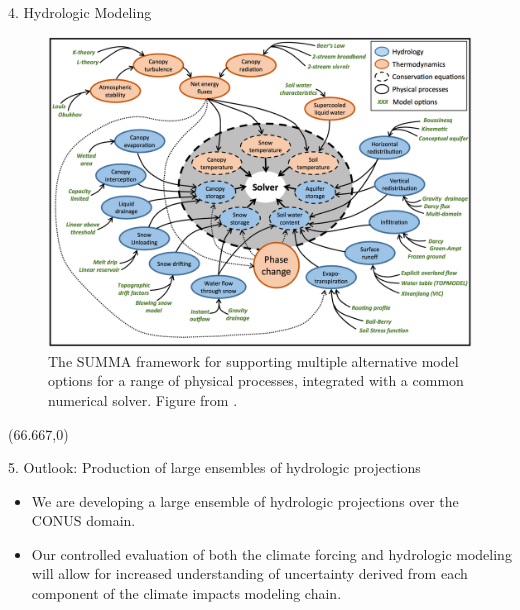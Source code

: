 \documentclass{beamer}
\begin{document}
\begin{frame}{}
\begin{columns}
\begin{column}{.3333\paperwidth}
\begin{textblock}{\textwidth \TPHorizModule}
\begin{block}{4. Hydrologic Modeling}
     \begin{figure}
      \center\includegraphics[width=0.6\linewidth]{figures/summa.png}
      \caption{The SUMMA framework for supporting multiple alternative model options for a range of physical processes, integrated with a common numerical solver. Figure from \citet{Clark_2015}.}
      \label{fig:summa}
     \end{figure}

    \end{block}
   \end{textblock}



   \begin{textblock}{\textwidth \TPHorizModule}(66.667,0)
    \begin{block}{5. Outlook: Production of large ensembles of hydrologic projections}

     \begin{itemize}
      \justifying
      \item We are developing a large ensemble of hydrologic projections over the CONUS domain.
      \item Our controlled evaluation of both the climate forcing and hydrologic modeling will allow for increased understanding of uncertainty derived from each component of the climate impacts modeling chain.
     \end{itemize}


\end{block}
\end{textblock}
\end{column}
\end{columns}
\end{frame}
\end{document}
